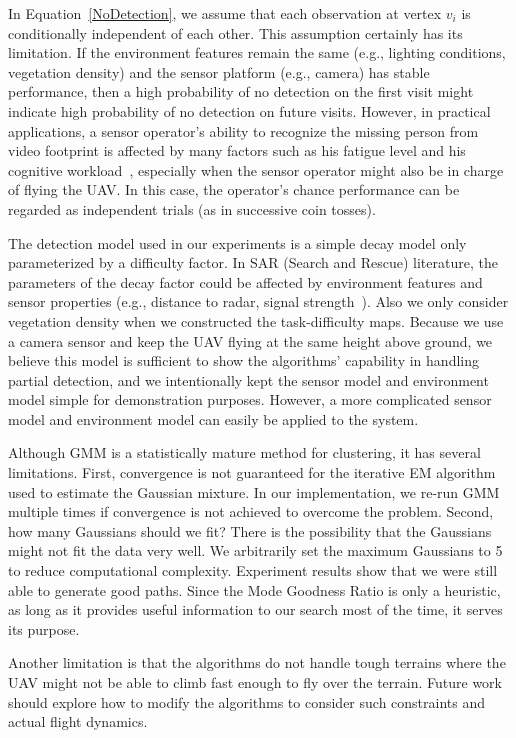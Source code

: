 In Equation~\ref{NoDetection}, we assume that each observation at vertex $v_i$ is conditionally independent of each other. This assumption certainly has its limitation. If the environment features remain the same (e.g., lighting conditions, vegetation density) and the sensor platform (e.g., camera) has stable performance, then a high probability of no detection on the first visit might indicate high probability of no detection on future visits. However, in practical applications, a sensor operator's ability to recognize the missing person from video footprint is affected by many factors such as his fatigue level and his cognitive workload~\cite{Goodrich2008Supporting}, especially when the sensor operator might also be in charge of flying the UAV. In this case, the operator's chance performance can be regarded as independent trials (as in successive coin tosses).

The detection model used in our experiments is a simple decay model only parameterized by a difficulty factor. In SAR (Search and Rescue) literature, the parameters of the decay factor could be affected by environment features and sensor properties (e.g., distance to radar, signal strength~\cite{Bourgault2006Optimal}). Also we only consider vegetation density when we constructed the task-difficulty maps. Because we use a camera sensor and keep the UAV flying at the same height above ground, we believe this model is sufficient to show the algorithms' capability in handling partial detection, and we intentionally kept the sensor model and environment model simple for demonstration purposes. However, a more complicated sensor model and environment model can easily be applied to the system. 

Although GMM is a statistically mature method for clustering, it has several limitations. First, convergence is not guaranteed for the iterative EM algorithm used to estimate the Gaussian mixture. In our implementation, we re-run GMM multiple times if convergence is not achieved to overcome the problem. Second, how many Gaussians should we fit? There is the possibility that the Gaussians might not fit the data very well. We arbitrarily set the maximum Gaussians to 5 to reduce computational complexity. Experiment results show that we were still able to generate good paths. Since the Mode Goodness Ratio is only a heuristic, as long as it provides useful information to our search most of the time, it serves its purpose.

Another limitation is that the algorithms do not handle tough terrains where the UAV might not be able to climb fast enough to fly over the terrain. Future work should explore how to modify the algorithms to consider such constraints and actual flight dynamics.

